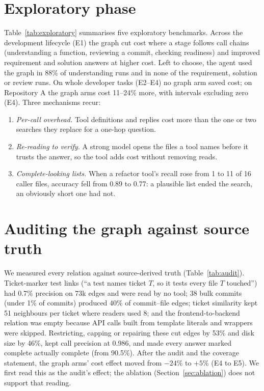 \documentclass[conference]{IEEEtran}
\begin{document}
\section{Exploratory phase}\label{sec:exploratory}

Table~\ref{tab:exploratory} summarises five exploratory benchmarks. Across the development lifecycle (E1) the graph cut
cost where a stage follows call chains (understanding a function, reviewing a commit, checking readiness) and improved
requirement and solution answers at higher cost. Left to choose, the agent used the graph in 88\% of understanding runs
and in none of the requirement, solution or review runs. On whole developer tasks (E2--E4) no graph arm saved cost; on
Repository A the graph arms cost 11--24\% more, with intervals excluding zero (E4). Three mechanisms recur:
\begin{enumerate}
\item \emph{Per-call overhead.} Tool definitions and replies cost more than the one or two searches they replace for a
  one-hop question.
\item \emph{Re-reading to verify.} A strong model opens the files a tool names before it trusts the answer, so the tool
  adds cost without removing reads.
\item \emph{Complete-looking lists.} When a refactor tool's recall rose from 1 to 11 of 16 caller files, accuracy fell
  from 0.89 to 0.77: a plausible list ended the search, an obviously short one had not.
\end{enumerate}

\section{Auditing the graph against source truth}\label{sec:audit}

We measured every relation against source-derived truth (Table~\ref{tab:audit}). Ticket-marker test links (``a test
names ticket $T$, so it tests every file $T$ touched'') had 0.7\% precision on 73k edges and were read by no tool;
38 bulk commits (under 1\% of commits) produced 40\% of commit--file edges; ticket similarity kept 51 neighbours per
ticket where readers used 8; and the frontend-to-backend relation was empty because API calls built from template
literals and wrappers were skipped. Restricting, capping or repairing these cut edges by 53\% and disk size by 46\%,
kept call precision at 0.986, and made every answer marked complete actually complete (from 90.5\%). After the audit
and the coverage statement, the graph arms' cost effect moved from $-24\%$ to $+5\%$ (E4 to E5). We first read this
as the audit's effect; the ablation (Section~\ref{sec:ablation}) does not support that reading.
\end{document}

